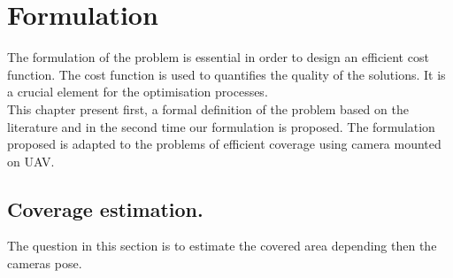 \chapter{Formulation}
\minitoc
The formulation of the problem is essential in order to design an efficient cost function. The cost function is  used to quantifies the quality of the solutions. It is a crucial element for the optimisation processes.\\
This chapter present first, a formal definition  of the problem based on the literature and in the second time our formulation is proposed. The formulation proposed is  adapted to the problems of efficient coverage using camera mounted on UAV.

\section{ Coverage estimation. }


 The question in this section is to estimate the covered area depending then the cameras pose.\\



